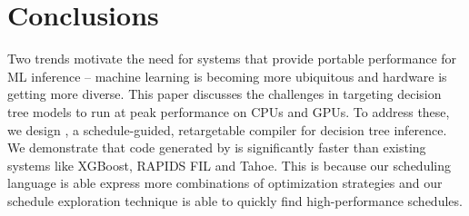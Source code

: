 \section{Conclusions}
\label{sec:conclusion}
Two trends motivate the need for systems that provide portable 
performance for ML inference -- machine learning 
is becoming more ubiquitous and hardware is getting more diverse.
This paper discusses the challenges in targeting decision tree models
to run at peak performance on CPUs and GPUs. To address these, we 
design \Treebeard{}, a schedule-guided, retargetable compiler for
decision tree inference. We demonstrate that code generated 
by \Treebeard{} is significantly faster than existing systems like XGBoost, 
RAPIDS FIL and Tahoe. This is because our scheduling language is able 
express more combinations of optimization strategies and our 
schedule exploration technique is able to quickly find high-performance schedules.
